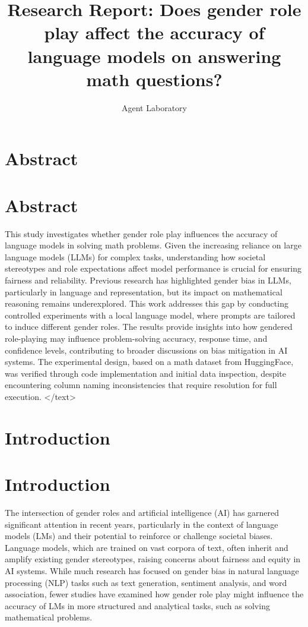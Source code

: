 \documentclass{article}
\title{Research Report: Does gender role play affect the accuracy of language models on answering math questions?}
\author{Agent Laboratory}
\begin{document}
\maketitle
\section{Abstract}
\section*{Abstract}
This study investigates whether gender role play influences the accuracy of language models in solving math problems. Given the increasing reliance on large language models (LLMs) for complex tasks, understanding how societal stereotypes and role expectations affect model performance is crucial for ensuring fairness and reliability. Previous research has highlighted gender bias in LLMs, particularly in language and representation, but its impact on mathematical reasoning remains underexplored. This work addresses this gap by conducting controlled experiments with a local language model, where prompts are tailored to induce different gender roles. The results provide insights into how gendered role-playing may influence problem-solving accuracy, response time, and confidence levels, contributing to broader discussions on bias mitigation in AI systems. The experimental design, based on a math dataset from HuggingFace, was verified through code implementation and initial data inspection, despite encountering column naming inconsistencies that require resolution for full execution.
</text>
\section{Introduction}
\section{Introduction}
The intersection of gender roles and artificial intelligence (AI) has garnered significant attention in recent years, particularly in the context of language models (LMs) and their potential to reinforce or challenge societal biases. Language models, which are trained on vast corpora of text, often inherit and amplify existing gender stereotypes, raising concerns about fairness and equity in AI systems. While much research has focused on gender bias in natural language processing (NLP) tasks such as text generation, sentiment analysis, and word association, fewer studies have examined how gender role play might influence the accuracy of LMs in more structured and analytical tasks, such as solving mathematical problems. 
\end{document}
